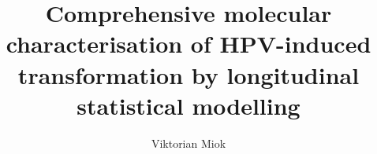 \title{Comprehensive molecular characterisation of HPV-induced transformation by longitudinal statistical modelling} 

\author{Viktorian Miok}




 




%
